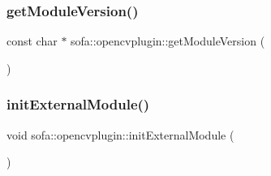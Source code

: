 \subsubsection{\texorpdfstring{get\+Module\+Version()}{getModuleVersion()}}
{\footnotesize\ttfamily const char $\ast$ sofa\+::opencvplugin\+::get\+Module\+Version (\begin{DoxyParamCaption}{ }\end{DoxyParamCaption})}

\mbox{\label{namespacesofa_1_1opencvplugin_a68923956b35ccd564cd92eb6879f1435}} 
\subsubsection{\texorpdfstring{init\+External\+Module()}{initExternalModule()}}
{\footnotesize\ttfamily void sofa\+::opencvplugin\+::init\+External\+Module (\begin{DoxyParamCaption}{ }\end{DoxyParamCaption})}

